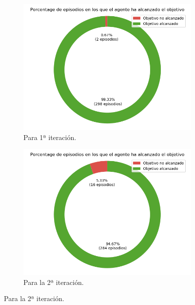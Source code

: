 \begin{figure}
    \centering
    \begin{subfigure}{.5\textwidth}
        \centering
        \includegraphics[scale=0.3]{cap5_experimentacion/images/CHANGE_ORIGIN-20_09-19_22-2, 1, 0_it1_porcentajeResuelto.png}
        \caption{Para 1ª iteración.}
        \label{fig:CHANGE_ORIGIN-20_09-19_22-2, 1, 0_it1_porcentajeResuelto}
    \end{subfigure}%
    \begin{subfigure}{.5\textwidth}
        \centering
        \includegraphics[scale=0.3]{cap5_experimentacion/images/CHANGE_ORIGIN-20_09-19_22-2, 1, 0_it2_porcentajeResuelto.png}
        \caption{Para la 2ª iteración.}
        \label{fig:CHANGE_ORIGIN-20_09-19_22-2, 1, 0_it2_porcentajeResuelto}

\end{subfigure}
\end{figure}
